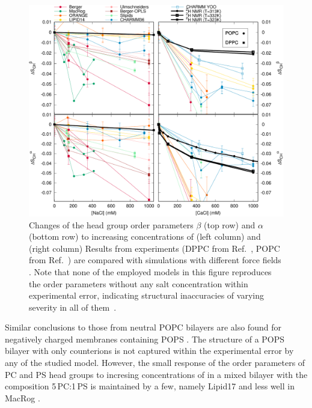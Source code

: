\begin{figure}[tbp]
  \centering
  \includegraphics[width=\figwidthfull]{../img/OrderParameterIONSchanges.pdf}
  \caption{\label{fig:catte16}
    Changes of the head group order parameters $\beta$ (top row) and $\alpha$ (bottom row) 
    to increasing concentrations of  (left column) and  (right column)
    Results from experiments 
    (DPPC from Ref.~\citep{akutsu81}, POPC from Ref.~\citep{altenbach84}) 
    are compared with simulations with different force fields \citep{nmrlipids, catte16}. 
    Note that none of the employed models in this figure reproduces the order parameters without any salt concentration
    within experimental error, indicating structural inaccuracies of varying severity in all of them~\citep{botan15}.
  }
\end{figure}


Similar conclusions to those from neutral POPC bilayers 
are also found for negatively charged membranes containing POPS \citep{nmrlipids_proj4}. 
The structure of a POPS bilayer with only  counterions
is not captured within the experimental error by any of the studied model. 
However, the small response of the order parameters of PC and PS head groups 
to incresing concentrations of  in a mixed bilayer with the composition 5\,PC:1\,PS 
is maintained by a few, 
namely Lipid17 \citep{lipid17-future} and less well in MacRog \citep{maciejewski14}. 

